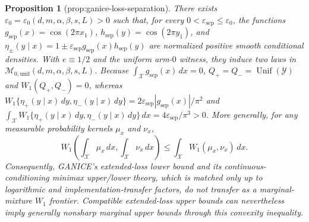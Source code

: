 \documentclass{article}
\newtheorem{proposition}{Proposition}
\begin{document}
\begin{proposition}[prop:ganice-loss-separation]\label{prop:ganice-loss-separation}
There exists \(\varepsilon_0=\varepsilon_0(d,m,\alpha,\beta,s,L)>0\) such that, for every \(0<\varepsilon_{\mathrm{sep}}\le\varepsilon_0\), the functions \(g_{\mathrm{sep}}(x)=\cos(2\pi x_1)\), \(h_{\mathrm{sep}}(y)=\cos(2\pi y_1)\), and \(\eta_{\pm}(y\mid x)=1\pm\varepsilon_{\mathrm{sep}}g_{\mathrm{sep}}(x)h_{\mathrm{sep}}(y)\) are normalized positive smooth conditional densities. With \(e\equiv1/2\) and the uniform arm-\(0\) witness, they induce two laws in \(\mathcal M_{0,\mathrm{unif}}(d,m,\alpha,\beta,s,L)\). Because \(\int_{\mathcal X}g_{\mathrm{sep}}(x)\,dx=0\), \(Q_+=Q_-=\operatorname{Unif}(\mathcal Y)\) and \(W_1(Q_+,Q_-)=0\), whereas \(W_1\{\eta_+(y\mid x)\,dy,\eta_-(y\mid x)\,dy\}=2\varepsilon_{\mathrm{sep}}|g_{\mathrm{sep}}(x)|/\pi^2\) and \(\int_{\mathcal X}W_1\{\eta_+(y\mid x)\,dy,\eta_-(y\mid x)\,dy\}\,dx=4\varepsilon_{\mathrm{sep}}/\pi^3>0\). More generally, for any measurable probability kernels \(\mu_x\) and \(\nu_x\), \[W_1\!\left(\int_{\mathcal X}\mu_x\,dx,\int_{\mathcal X}\nu_x\,dx\right)\le\int_{\mathcal X}W_1(\mu_x,\nu_x)\,dx.\] Consequently, GANICE's extended-loss lower bound and its continuous-conditioning minimax upper/lower theory, which is matched only up to logarithmic and implementation-transfer factors, do not transfer as a marginal-mixture \(W_1\) frontier. Compatible extended-loss upper bounds can nevertheless imply generally nonsharp marginal upper bounds through this convexity inequality.
\end{proposition}
\end{document}

